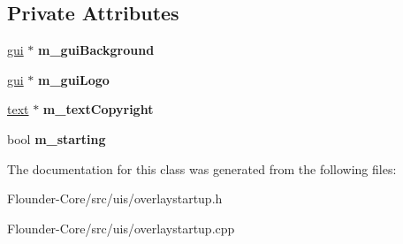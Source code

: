 \subsection*{Private Attributes}
\begin{DoxyCompactItemize}
\item 
\mbox{\label{classflounder_1_1overlaystartup_aeac0390910aaf758160ea68c56d21389}} 
\hyperlink{classflounder_1_1gui}{gui} $\ast$ {\bfseries m\+\_\+gui\+Background}
\item 
\mbox{\label{classflounder_1_1overlaystartup_a296cfebb6b626dfdbc6e96d4bb1f7362}} 
\hyperlink{classflounder_1_1gui}{gui} $\ast$ {\bfseries m\+\_\+gui\+Logo}
\item 
\mbox{\label{classflounder_1_1overlaystartup_a24c8f82ec3e123e7c155209380d88101}} 
\hyperlink{classflounder_1_1text}{text} $\ast$ {\bfseries m\+\_\+text\+Copyright}
\item 
\mbox{\label{classflounder_1_1overlaystartup_aa049202a35b4a8eb0338b34bb4c99f33}} 
bool {\bfseries m\+\_\+starting}
\end{DoxyCompactItemize}


The documentation for this class was generated from the following files\+:\begin{DoxyCompactItemize}
\item 
Flounder-\/\+Core/src/uis/overlaystartup.\+h\item 
Flounder-\/\+Core/src/uis/overlaystartup.\+cpp\end{DoxyCompactItemize}

